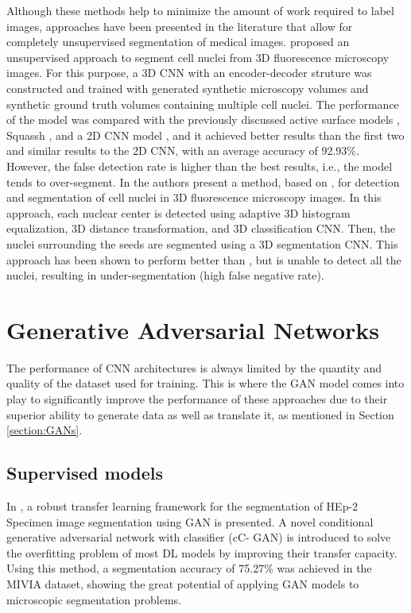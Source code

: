 Although these methods help to minimize the amount of work required to label images, approaches have been presented in the literature that allow for completely unsupervised segmentation of medical images. \citet{SOTA:3DCNN} proposed an unsupervised approach to segment cell nuclei from \ac{3D} fluorescence microscopy images. For this purpose, a \ac{3D} \ac{CNN} with an encoder-decoder struture was constructed and trained with generated synthetic microscopy volumes and synthetic ground truth volumes containing multiple cell nuclei. The performance of the model was compared with the previously discussed active surface models \cite{3D:active,active:inhmo}, Squassh \cite{squassh}, and a \ac{2D} \ac{CNN} model \cite{2dplus}, and it achieved better results than the first two and similar results to the \ac{2D} \ac{CNN}, with an average accuracy of 92.93\%. However, the false detection rate is higher than the best results, i.e., the model tends to over-segment. In \cite{3d:detection} the authors present a method, based on \cite{SOTA:3DCNN}, for detection and segmentation of cell nuclei in \ac{3D} fluorescence microscopy images. In this approach, each nuclear center is detected using adaptive \ac{3D} histogram equalization, \ac{3D} distance transformation, and \ac{3D} classification \ac{CNN}. Then, the nuclei surrounding the seeds are segmented using a \ac{3D} segmentation \ac{CNN}. This approach has been shown to perform better than \cite{SOTA:3DCNN}, but is unable to detect all the nuclei, resulting in under-segmentation (high false negative rate). 

\section{Generative Adversarial Networks}

The performance of \ac{CNN} architectures is always limited by the quantity and quality of the dataset used for training. This is where the \ac{GAN} model comes into play to significantly improve the performance of these approaches due to their superior ability to generate data as well as translate it, as mentioned in Section \ref{section:GANs}.

\subsection{Supervised models}

In \cite{cCGAN}, a robust transfer learning framework for the segmentation of HEp-2 Specimen image segmentation using \ac{GAN} is presented. A novel conditional generative adversarial network with classifier (cC- GAN) is introduced to solve the overfitting problem of most DL models by improving their transfer capacity. Using this method, a segmentation accuracy of 75.27\% was achieved in the MIVIA dataset, showing the great potential of applying \ac{GAN} models to microscopic segmentation problems.

